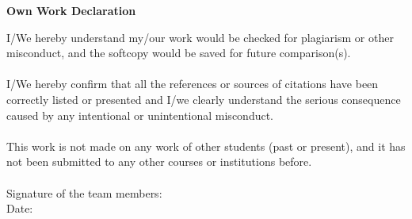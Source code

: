 \clearpage
\begin{center}
    \textbf{Own Work Declaration}
\end{center}
\vspace{3cm}
{\fontsize{12pt}{14pt}\selectfont
\noindent I/We hereby understand my/our work would be checked for plagiarism or other misconduct, and the softcopy would be saved for future comparison(s). \\
\\
\noindent I/We hereby confirm that all the references or sources of citations have been correctly listed or presented and I/we clearly understand the serious consequence caused by any intentional or unintentional misconduct.\\ 
\\
\noindent This work is not made on any work of other students (past or present), and it has not been submitted to any other courses or institutions before.
\\
\\[3cm]
\noindent Signature  of the team members:
\\[3cm]
\vspace{3cm}
Date:
\vspace{3cm}
\vfill
}

\clearpage

